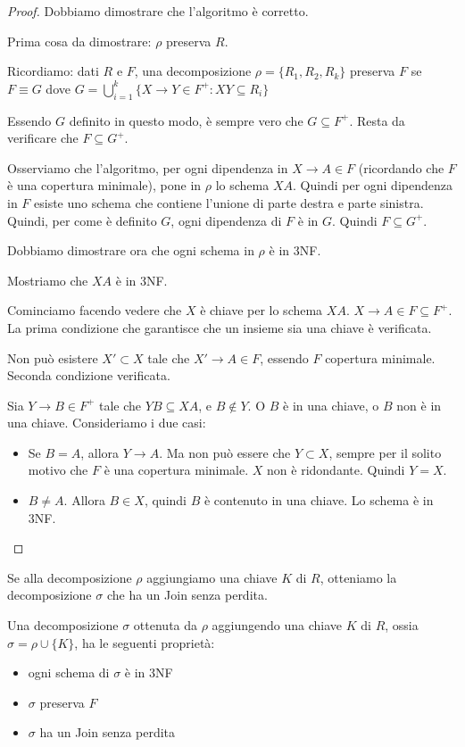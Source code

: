 \begin{proof}
Dobbiamo dimostrare che l'algoritmo \`e corretto.

Prima cosa da dimostrare: $\rho$ preserva $R$.

Ricordiamo: dati $R$ e $F$, una decomposizione $\rho = \{ R_1, R_2, R_k \}$ preserva $F$ se $F \equiv G$ dove $G = \bigcup_{i = 1}^k \{ X \to Y \in F^+ : XY \subseteq R_i \}$

Essendo $G$ definito in questo modo, \`e sempre vero che $G \subseteq F^+$. Resta da verificare che $F \subseteq G^+$.

Osserviamo che l'algoritmo, per ogni dipendenza in $X \to A \in F$ (ricordando che $F$ \`e una copertura minimale), pone in $\rho$ lo schema $XA$. Quindi per ogni dipendenza in $F$ esiste uno schema che contiene l'unione di parte destra e parte sinistra. Quindi, per come \`e definito $G$, ogni dipendenza di $F$ \`e in $G$. Quindi $F \subseteq G^+$.

Dobbiamo dimostrare ora che ogni schema in $\rho$ \`e in 3NF.

Mostriamo che $XA$ \`e in 3NF.

Cominciamo facendo vedere che $X$ \`e chiave per lo schema $XA$. $X \to A \in F \subseteq F^+$. La prima condizione che garantisce che un insieme sia una chiave \`e verificata.

Non pu\`o esistere $X' \subset X$ tale che $X' \to A \in F$, essendo $F$ copertura minimale. Seconda condizione verificata.

Sia $Y \to B \in F^+$ tale che $YB \subseteq XA$, e $B \notin Y$. O $B$ \`e in una chiave, o $B$ non \`e in una chiave. Consideriamo i due casi:
\begin{itemize}
    \item Se $B = A$, allora $Y \to A$. Ma non pu\`o essere che $Y \subset X$, sempre per il solito motivo che $F$ \`e una copertura minimale. $X$ non \`e ridondante. Quindi $Y = X$.
    \item $B \neq A$. Allora $B \in X$, quindi $B$ \`e contenuto in una chiave.  Lo schema \`e in 3NF.
\end{itemize}
\end{proof}

Se alla decomposizione $\rho$ aggiungiamo una chiave $K$ di $R$, otteniamo la decomposizione $\sigma$ che ha un Join senza perdita.

Una decomposizione $\sigma$ ottenuta da $\rho$ aggiungendo una chiave $K$ di $R$, ossia $\sigma = \rho \cup \{ K \}$, ha le seguenti propriet\`a:
\begin{itemize}
    \item ogni schema di $\sigma$ \`e in 3NF
    \item $\sigma$ preserva $F$
    \item $\sigma$ ha un Join senza perdita
\end{itemize}

